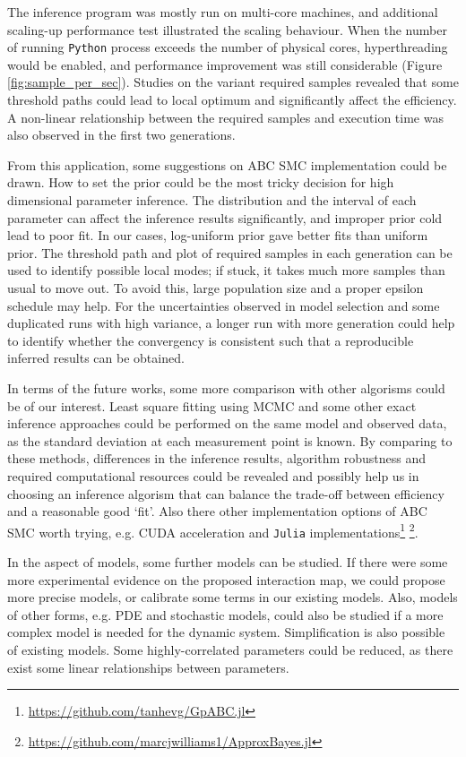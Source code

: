 The inference program was mostly run on multi-core machines, and additional scaling-up performance test illustrated the scaling behaviour. When the number of running \verb|Python| process exceeds the number of physical cores, hyperthreading would be enabled, and performance improvement was still considerable (Figure \ref{fig:sample_per_sec}). Studies on the variant required samples revealed that some threshold paths could lead to local optimum and significantly affect the efficiency. A non-linear relationship between the required samples and execution time was also observed in the first two generations.


 From this application, some suggestions on ABC SMC implementation could be drawn. How to set the prior could be the most tricky decision for high dimensional parameter inference. The distribution and the interval of each parameter can affect the inference results significantly, and improper prior cold lead to poor fit. In our cases, log-uniform prior gave better fits than uniform prior. The threshold path and plot of required samples in each generation can be used to identify possible local modes; if stuck, it takes much more samples than usual to move out. To avoid this, large population size and a proper epsilon schedule may help. For the uncertainties observed in model selection and some duplicated runs with high variance, a longer run with more generation could help to identify whether the convergency is consistent such that a reproducible inferred results can be obtained.


In terms of the future works, some more comparison with other algorisms could be of our interest. Least square fitting using MCMC \cite{ref:MCMC} and some other exact inference approaches could be performed on the same model and observed data, as the standard deviation at each measurement point is known. By comparing to these methods, differences in the inference results, algorithm robustness and required computational resources could be revealed and possibly help us in choosing an inference algorism that can balance the trade-off between efficiency and a reasonable good `fit'. Also there other implementation options of ABC SMC worth trying, e.g. CUDA acceleration and \verb|Julia| implementations\footnote[1]{\url{https://github.com/tanhevg/GpABC.jl}} \footnote[2]{\url{https://github.com/marcjwilliams1/ApproxBayes.jl}}.

In the aspect of models, some further models can be studied. If there were some more experimental evidence on the proposed interaction map, we could propose more precise models, or calibrate some terms in our existing models. Also, models of other forms, e.g. PDE and stochastic models, could also be studied if a more complex model is needed for the dynamic system. Simplification is also possible of existing models. Some highly-correlated parameters could be reduced, as there exist some linear relationships between parameters.  

